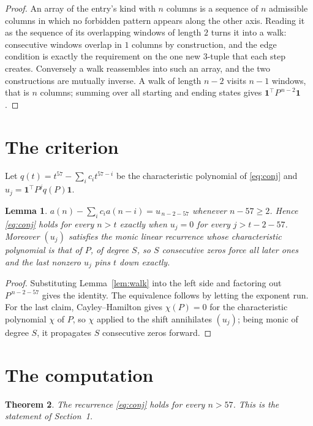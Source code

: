 \documentclass[11pt,a4paper]{article}
\theoremstyle{plain}
\newtheorem{theorem}{Theorem}
\newtheorem{lemma}[theorem]{Lemma}
\theoremstyle{definition}
\begin{document}
\begin{proof}
An array of the entry's kind with $n$ columns is a sequence of $n$ admissible columns in
which no forbidden pattern appears along the other axis. Reading it as the sequence of its
overlapping windows of length $2$ turns it into a walk: consecutive windows overlap in
$1$ columns by construction, and the edge condition is exactly the requirement on the one
new $3$-tuple that each step creates. Conversely a walk reassembles into such an array,
and the two constructions are mutually inverse. A walk of length $n-2$ visits $n-1$
windows, that is $n$ columns; summing over all starting and ending states gives
$\mathbf{1}^{\!\top}P^{\,n-2}\mathbf{1}$.
\end{proof}

\section{The criterion}

Let $q(t)=t^{57}-\sum_i c_i t^{57-i}$ be the characteristic polynomial of
\eqref{eq:conj} and $u_j=\mathbf{1}^{\!\top}P^{j}q(P)\mathbf{1}$.

\begin{lemma}\label{lem:crit}
$a(n)-\sum_i c_i a(n-i)=u_{\,n-2-57}$ whenever $n-57\ge2$. Hence
\eqref{eq:conj} holds for every $n>t$ exactly when $u_j=0$ for every
$j>t-2-57$. Moreover $(u_j)$ satisfies the monic linear recurrence whose
characteristic polynomial is that of $P$, of degree $S$, so $S$ consecutive zeros force all
later ones and the last nonzero $u_j$ pins $t$ down exactly.
\end{lemma}

\begin{proof}
Substituting Lemma~\ref{lem:walk} into the left side and factoring out
$P^{\,n-2-57}$ gives the identity. The equivalence follows by letting the exponent
run. For the last claim, Cayley--Hamilton gives $\chi(P)=0$ for the characteristic
polynomial $\chi$ of $P$, so $\chi$ applied to the shift annihilates $(u_j)$; being monic of
degree $S$, it propagates $S$ consecutive zeros forward.
\end{proof}

\section{The computation}

\begin{theorem}
The recurrence \eqref{eq:conj} holds for every $n>57$. This is the statement of
Section~1.
\end{theorem}
\end{document}
